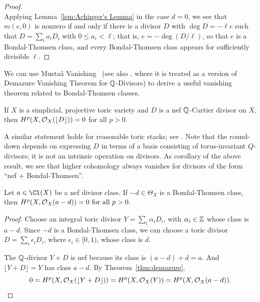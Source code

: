 \documentclass{amsart}
\begin{document}
\begin{proof}
\medskip{}\\
Applying Lemma~\ref{lem:Achinger's Lemma} in the case $d=0$, we see that $m(e,0)$ is nonzero
if and only if there is a divisor $D$ with $\deg D = -\ell e$ such that $D = \sum_{i} a_{i}D_{i}$ with $0\leq a_{i} < \ell$;
that is, $e = -\deg(D/\ell)$, so that $e$ is a Bondal-Thomsen class, and every Bondal-Thomsen class appears for sufficiently divisible $\ell$.
\end{proof}



We can use Musta\v{a} Vanishing~\cite[Theorem 0.1]{mustata} (see also \cite[Theorem 9.3.5]{CLS2011}, where it is treated as a version of Demazure Vanishing Theorem for $\mathbb Q$-Divisors) to derive a useful vanishing theorem related to Bondal-Thomsen classes.
\begin{thm} \label{thm:demazure}
If $X$ is a simplicial, projective toric variety and $D$ is a nef $\mathbb Q$-Cartier divisor on $X$, then
$H^p(X, {\mathcal O}_{X}(\lfloor D \rfloor )) = 0$
for all $p > 0$.
\end{thm}
A similar statement holds for reasonable toric stacks; see \cite[Lemma 2.20]{BBB+24}.
Note that the round-down depends on expressing $D$ in terms of a basis consisting of torus-invariant $Q$-divisors;
it is not an intrinsic operation on divisors.  As corollary of the above result, we see that higher cohomology always vanishes for divisors of the form ``nef $+$ Bondal-Thomsen''.

\begin{prop}\label{prop:Demazure}
    Let $a\in \Cl(X)$ be a nef divisor class. If $-d\in \Theta_X$ is a Bondal-Thomsen class, then
    $
    H^p(X,{\mathcal O}_X(a-d)) = 0 \text{ for all } p>0.
    $
\end{prop}
\begin{proof}
Choose an integral toric divisor $Y=\sum_{i} \alpha_iD_i$, with $\alpha_i\in \mathbb Z$ whose class is $a-d$.  Since $-d$ is a Bondal-Thomsen class, we can choose a toric divisor $D=\sum_i \epsilon_iD_i$, where $\epsilon_i \in [0,1)$, whose class is $d$.

The $\mathbb Q$-divisor $Y+D$ is nef because its class is $(a-d)+d=a$.  And $\lfloor Y+D\rfloor = Y$ has class $a-d$.  By Theorem~\ref{thm:demazure},
    \[
    0 = H^p(X, {\mathcal O}_{X}(\lfloor Y+D \rfloor )) =  H^p(X, {\mathcal O}_{X}(Y)) =  H^p(X, {\mathcal O}_{X}(a-d)).
    \]
\end{proof}
\end{document}
